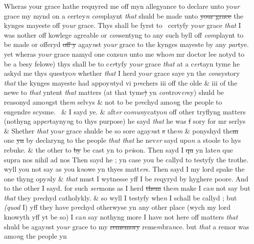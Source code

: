 \documentclass[12pt, a4paper]{book}
\begin{document}
		\ifthenelse{\isodd{\thepage}}
		{\reversemarginpar}
		{\normalmarginpar}
		Wheras your grace  hathe requyred me off myn allegyance to declare unto
yo\textit{ur} grace my mynd on a certey\textit{n}
               \textit{com}playnt \textit{that} shuld be made unto \sout{your 
grace} the kynges mayeste off yo\textit{ur} grace. Thys shall be fyrst to 
certyfy yo\textit{ur} grace \textit{that} I was nother off kowlege agreable or \textit{con}sentyng
to any such byll off \textit{com}playnt to be made or offeryd \sout{off y} agay\textit{n}st
yo\textit{ur} grace to the kynges mayeste by any \textit{par}tye. yet wheras yo\textit{ur} grace
namyd one coxsu\textit{n} unto me who\textit{m} mr doctor lee notyd to be a besy
felowe) thys shall be to c\textit{er}tyfy yo\textit{ur} grace \textit{that} at a c\textit{er}tayn tyme he askyd
me thys questyo\textit{n} whether \textit{that} I herd yo\textit{ur} grace saye yn the \textit{con}systory
\textit{that} the kynges mayeste had appoy\textit{n}tyd vi p\textit{re}chers iii off the olde \& iii of 
the newe to \textit{that} yntent \textit{that} matters (at that tyme\sout{) }yn \textit{con}trov\textit{er}sy) shuld
be reasonyd amo\textit{n}gst the\textit{m} selvys \& not to be p\textit{re}chyd amo\textit{n}g the 
people to engendre scysme.  \& I sayd ye. \& aft\textit{er} co\textit{mun}ycatyo\textit{n} off other
tryflyng matters (nothyng ap\textit{per}tayny\textit{n}g to thys purpose) he sayd
\textit{that} he was \sout{f} sory for mr serlys \& Shether \textit{that} yo\textit{ur} grace shulde
be so sore agay\textit{n}st \sout{s} the\textit{m} \& ponyshyd the\sout{m} one \sout{yn }
               by
			 declaryng to 
the people \textit{
                  that 
			that} he nev\textit{er} sayd upo\textit{n} a stoole to hys rebuke. \& the
other to \sout{by }
               be 
			cast yn to p\textit{ri}son. Then sayd I \sout{qu }yn late\textit{n} que supra
nos nihil ad nos Then sayd he ; yn case you be callyd to 
testyfy the trothe. wyll you not say as you k\textit{n}owe yn thyes
matt\textit{er}s. Then sayd I my lord spake the one thyng opy\textit{n}ly
\& \textit{that} must I wytnesse yff I be reqyryd by hyghere poore.
And to the other I sayd. for such \textit{ser}mons as I herd \sout{them }the\textit{m} 
make I ca\textit{n} not say but \textit{that} they p\textit{re}chyd catholykly. \& so wyll I
testyfy whe\textit{n} I schall be callyd ; but \textit{(quod} I) yff they have p\textit{re}chyd
otherwyse yn any other place (wych my lord knowyth yff
yt be so) I ca\textit{n} say nothyng more I have not here off
matters \textit{that} shuld be agay\textit{n}st yo\textit{ur} grace to my \sout{rememory}
reme\textit{m}bra\textit{n}ce. but \textit{that} a remor was amo\textit{n}g the people yn 
			
\end{document}
